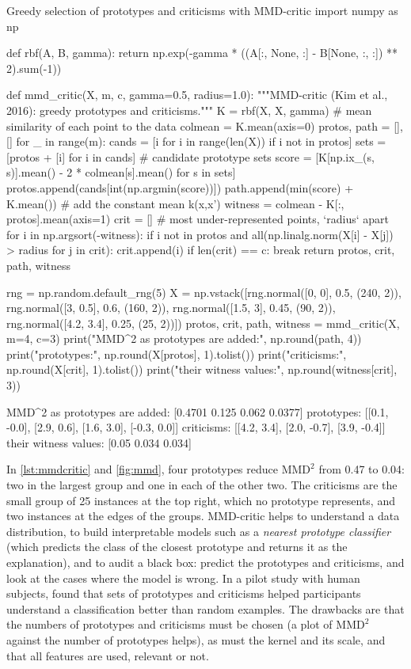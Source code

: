 \begin{pylisting}[label={lst:mmdcritic}]{Greedy selection of prototypes and criticisms with MMD-critic}
import numpy as np

def rbf(A, B, gamma):
    return np.exp(-gamma * ((A[:, None, :] - B[None, :, :]) ** 2).sum(-1))

def mmd_critic(X, m, c, gamma=0.5, radius=1.0):
    """MMD-critic (Kim et al., 2016): greedy prototypes and criticisms."""
    K = rbf(X, X, gamma)
    # mean similarity of each point to the data
    colmean = K.mean(axis=0)
    protos, path = [], []
    for _ in range(m):
        cands = [i for i in range(len(X)) if i not in protos]
        sets = [protos + [i] for i in cands]               # candidate prototype sets
        score = [K[np.ix_(s, s)].mean() - 2 * colmean[s].mean() for s in sets]
        protos.append(cands[int(np.argmin(score))])
        path.append(min(score) + K.mean())      # add the constant mean k(x,x')
    witness = colmean - K[:, protos].mean(axis=1)
    crit = []                          # most under-represented points, `radius` apart
    for i in np.argsort(-witness):
        if i not in protos and all(np.linalg.norm(X[i] - X[j]) > radius for j in crit):
            crit.append(i)
        if len(crit) == c:
            break
    return protos, crit, path, witness

rng = np.random.default_rng(5)
X = np.vstack([rng.normal([0, 0], 0.5, (240, 2)), rng.normal([3, 0.5], 0.6, (160, 2)),
               rng.normal([1.5, 3], 0.45, (90, 2)), rng.normal([4.2, 3.4], 0.25, (25, 2))])
protos, crit, path, witness = mmd_critic(X, m=4, c=3)
print("MMD^2 as prototypes are added:", np.round(path, 4))
print("prototypes:", np.round(X[protos], 1).tolist())
print("criticisms:", np.round(X[crit], 1).tolist())
print("their witness values:", np.round(witness[crit], 3))
\end{pylisting}
\begin{pyoutput}
MMD^2 as prototypes are added: [0.4701 0.125  0.062  0.0377]
prototypes: [[0.1, -0.0], [2.9, 0.6], [1.6, 3.0], [-0.3, 0.0]]
criticisms: [[4.2, 3.4], [2.0, -0.7], [3.9, -0.4]]
their witness values: [0.05  0.034 0.034]
\end{pyoutput}

In \cref{lst:mmdcritic} and \cref{fig:mmd}, four prototypes reduce $\mathrm{MMD}^2$ from 0.47 to 0.04:
two in the largest group and one in each of the other two. The criticisms are the small group of 25
instances at the top right, which no prototype represents, and two instances at the edges of the
groups. MMD-critic helps to understand a data distribution, to build interpretable models such as a
\emph{nearest prototype classifier} (which predicts the class of the closest prototype and returns it as
the explanation), and to audit a black box: predict the prototypes and criticisms, and look at the cases
where the model is wrong. In a pilot study with human subjects, \citet{kim2016examples} found that sets of prototypes and criticisms helped
participants understand a classification better than random examples. The drawbacks are that the
numbers of prototypes and criticisms must be chosen (a plot of $\mathrm{MMD}^2$ against the number of
prototypes helps), as must the kernel and its scale, and that all features are used, relevant or not.

